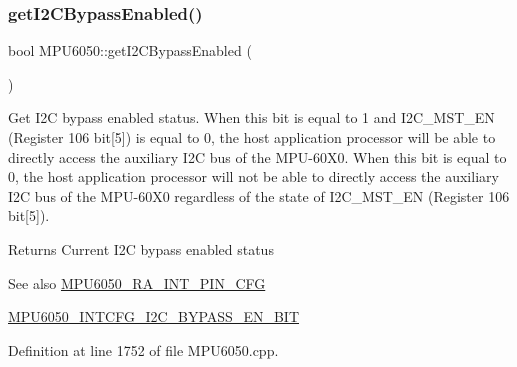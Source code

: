 \subsubsection{\texorpdfstring{getI2CBypassEnabled()}{getI2CBypassEnabled()}}
{\footnotesize\ttfamily bool M\+P\+U6050\+::get\+I2\+C\+Bypass\+Enabled (\begin{DoxyParamCaption}{ }\end{DoxyParamCaption})}

Get I2C bypass enabled status. When this bit is equal to 1 and I2\+C\+\_\+\+M\+S\+T\+\_\+\+EN (Register 106 bit\mbox{[}5\mbox{]}) is equal to 0, the host application processor will be able to directly access the auxiliary I2C bus of the M\+P\+U-\/60\+X0. When this bit is equal to 0, the host application processor will not be able to directly access the auxiliary I2C bus of the M\+P\+U-\/60\+X0 regardless of the state of I2\+C\+\_\+\+M\+S\+T\+\_\+\+EN (Register 106 bit\mbox{[}5\mbox{]}). \begin{DoxyReturn}{Returns}
Current I2C bypass enabled status 
\end{DoxyReturn}
\begin{DoxySeeAlso}{See also}
\mbox{\hyperlink{MPU6050_8h_a82344e1daef2bac2e0d938319528be6c}{M\+P\+U6050\+\_\+\+R\+A\+\_\+\+I\+N\+T\+\_\+\+P\+I\+N\+\_\+\+C\+FG}} 

\mbox{\hyperlink{MPU6050_8h_ab3dd639412ccf5b69cfb66346d0b6b99}{M\+P\+U6050\+\_\+\+I\+N\+T\+C\+F\+G\+\_\+\+I2\+C\+\_\+\+B\+Y\+P\+A\+S\+S\+\_\+\+E\+N\+\_\+\+B\+IT}} 
\end{DoxySeeAlso}


Definition at line 1752 of file M\+P\+U6050.\+cpp.


\begin{DoxyCode}{0}

\end{DoxyCode}
\mbox{\label{classMPU6050_a6b45e538f2082eb1b1975ed56e3e21bc}} 
